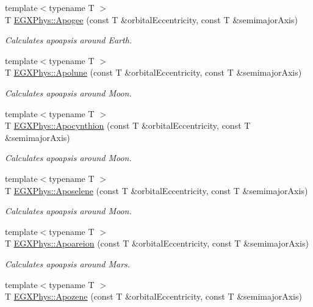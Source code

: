 \begin{DoxyCompactItemize}
{\footnotesize template$<$typename T $>$ }\\T \hyperlink{group___apoapsis_ga5cf587a051db28cae9e028a2b4955b0d}{E\+G\+X\+Phys\+::\+Apogee} (const T \&orbital\+Eccentricity, const T \&semimajor\+Axis)
\begin{DoxyCompactList}\small\item\em Calculates apoapsis around Earth. \end{DoxyCompactList}\item 
{\footnotesize template$<$typename T $>$ }\\T \hyperlink{group___apoapsis_gacc68b49812c38394611e1ef3a8bf0e3e}{E\+G\+X\+Phys\+::\+Apolune} (const T \&orbital\+Eccentricity, const T \&semimajor\+Axis)
\begin{DoxyCompactList}\small\item\em Calculates apoapsis around Moon. \end{DoxyCompactList}\item 
{\footnotesize template$<$typename T $>$ }\\T \hyperlink{group___apoapsis_ga557bb4d1a0ce7f17aaa8f8de469d4f52}{E\+G\+X\+Phys\+::\+Apocynthion} (const T \&orbital\+Eccentricity, const T \&semimajor\+Axis)
\begin{DoxyCompactList}\small\item\em Calculates apoapsis around Moon. \end{DoxyCompactList}\item 
{\footnotesize template$<$typename T $>$ }\\T \hyperlink{group___apoapsis_gab61f3b2d6a5be3f62f5fb6dfdf802014}{E\+G\+X\+Phys\+::\+Aposelene} (const T \&orbital\+Eccentricity, const T \&semimajor\+Axis)
\begin{DoxyCompactList}\small\item\em Calculates apoapsis around Moon. \end{DoxyCompactList}\item 
{\footnotesize template$<$typename T $>$ }\\T \hyperlink{group___apoapsis_ga8d8ac5814f653e229e1d463b432ffca5}{E\+G\+X\+Phys\+::\+Apoareion} (const T \&orbital\+Eccentricity, const T \&semimajor\+Axis)
\begin{DoxyCompactList}\small\item\em Calculates apoapsis around Mars. \end{DoxyCompactList}\item 
{\footnotesize template$<$typename T $>$ }\\T \hyperlink{group___apoapsis_ga44d3dd8d8b350d053b25b7b1f1e15534}{E\+G\+X\+Phys\+::\+Apozene} (const T \&orbital\+Eccentricity, const T \&semimajor\+Axis)

\end{DoxyCompactItemize}
